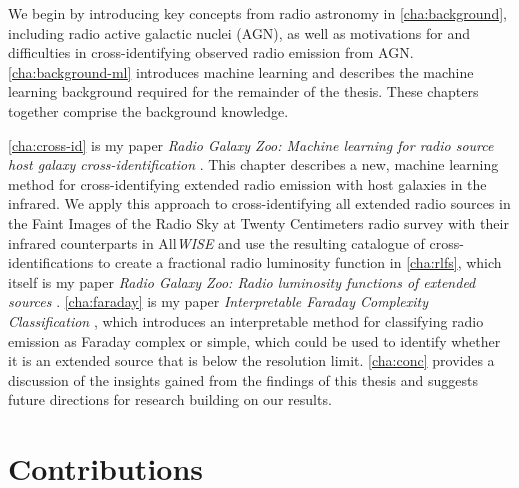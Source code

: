 \documentclass[11pt, a4paper]{book}
\begin{document}
We begin by introducing key concepts from radio astronomy in \autoref{cha:background}, including radio active galactic nuclei (AGN), as well as motivations for and difficulties in cross-identifying observed radio emission from AGN. \autoref{cha:background-ml} introduces machine learning and describes the machine learning background required for the remainder of the thesis. These chapters together comprise the background knowledge.

\autoref{cha:cross-id} is my paper \emph{Radio Galaxy Zoo: Machine learning for radio source host galaxy cross-identification} \citep{alger18radio}. This chapter describes a new, machine learning method for cross-identifying extended radio emission with host galaxies in the infrared. We apply this approach to cross-identifying all extended radio sources in the Faint Images of the Radio Sky at Twenty Centimeters radio survey \citep[FIRST;][]{becker95first} with their infrared counterparts in All\emph{WISE} \citep{cutri2013wiseexplanatory} and use the resulting catalogue of cross-identifications to create a fractional radio luminosity function in \autoref{cha:rlfs}, which itself is my paper \emph{Radio Galaxy Zoo: Radio luminosity functions of extended sources} \citep{alger21rlfs}. \autoref{cha:faraday} is my paper \emph{Interpretable Faraday Complexity Classification} \citep{alger2021interpretable}, which introduces an interpretable method for classifying radio emission as Faraday complex or simple, which could be used to identify whether it is an extended source that is below the resolution limit. \autoref{cha:conc} provides a discussion of the insights gained from the findings of this thesis and suggests future directions for research building on our results.

\section{Contributions}
\label{sec:contributions}
\end{document}
